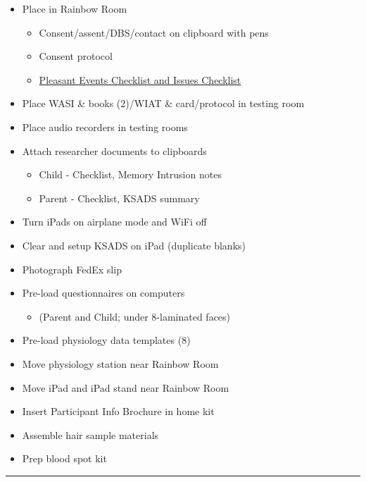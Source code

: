 \documentclass[]{book}
\providecommand{\tightlist}{%
  \setlength{\itemsep}{0pt}\setlength{\parskip}{0pt}}
\begin{document}
\begin{itemize}
\tightlist
\item
  Place in Rainbow Room

  \begin{itemize}
  \tightlist
  \item
    Consent/assent/DBS/contact on clipboard with pens
  \item
    Consent protocol
  \item
    \href{https://app.box.com/file/630327764749}{Pleasant Events Checklist and Issues Checklist}
  \end{itemize}
\item
  Place WASI \& books (2)/WIAT \& card/protocol in testing room
\item
  Place audio recorders in testing rooms
\item
  Attach researcher documents to clipboards

  \begin{itemize}
  \tightlist
  \item
    Child - Checklist, Memory Intrusion notes
  \item
    Parent - Checklist, KSADS summary
  \end{itemize}
\item
  Turn iPads on airplane mode and WiFi off
\item
  Clear and setup KSADS on iPad (duplicate blanks)
\item
  Photograph FedEx slip
\item
  Pre-load questionnaires on computers

  \begin{itemize}
  \tightlist
  \item
    (Parent and Child; under 8-laminated faces)
  \end{itemize}
\item
  Pre-load physiology data templates (8)
\item
  Move physiology station near Rainbow Room
\item
  Move iPad and iPad stand near Rainbow Room
\item
  Insert Participant Info Brochure in home kit
\item
  Assemble hair sample materials
\item
  Prep blood spot kit
\end{itemize}

\begin{center}\rule{0.5\linewidth}{0.5pt}\end{center}
\end{document}
